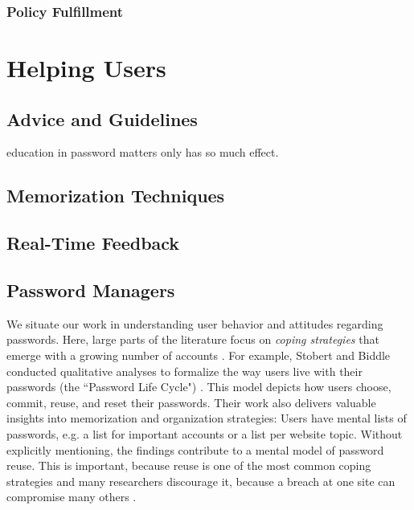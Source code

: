 		\subsubsection{Policy Fulfillment}


\section{Helping Users}
	\subsection{Advice and Guidelines}
	
	education in password matters only has so much effect. 
	
	
	\subsection{Memorization Techniques}
	\subsection{Real-Time Feedback}
	\subsection{Password Managers}
	
	We situate our work in understanding user behavior and attitudes regarding passwords. Here, large parts of the literature focus on \textit{coping strategies} that emerge with a growing number of accounts \cite{Florencio2007LargeScaleStudyPasswordHabits, Florencio2014PasswordPortfoliosFiniteUser}. For example, Stobert and Biddle conducted qualitative analyses to formalize the way users live with their passwords (the ``Password Life Cycle") \cite{Stobert2014PasswordLifeCycle}. This model depicts how users choose, commit, reuse, and reset their passwords. Their work also delivers valuable insights into memorization and organization strategies: Users have mental lists of passwords, e.g. a list for important accounts or a list per website topic. Without explicitly mentioning, the findings contribute to a mental model of password reuse. This is important, because reuse is one of the most common coping strategies \cite{Das2014TangledWeb, Gaw2006PasswordManagement, Hayashi2011DiaryStudyPWs} and many researchers discourage it, because a breach at one site can compromise many others \cite{Bonneau2012ScienceOfGuessing, Komanduri2011OfPasswordsAndPeople}. 
	
